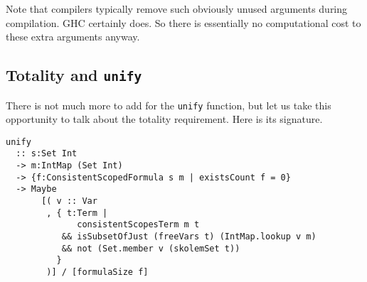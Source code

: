 \documentclass[sigconf, review]{acmart}
\newcommand{\tc}[1]{{\small\texttt{#1}}}
\newtheorem{principle}{Principle}
\begin{document}
Note that compilers typically remove such obviously unused arguments during
compilation. GHC certainly does. So there is essentially no computational cost to
these extra arguments anyway.

%
%
%

\subsection{Totality and \tc{unify}}
\label{checking-unify}

There is not much more to add for the \tc{unify} function, but let us take this
opportunity to talk about the totality requirement. Here is its signature.

\begin{verbatim}
unify
  :: s:Set Int
  -> m:IntMap (Set Int)
  -> {f:ConsistentScopedFormula s m | existsCount f = 0}
  -> Maybe
       [( v :: Var
        , { t:Term |
              consistentScopesTerm m t
           && isSubsetOfJust (freeVars t) (IntMap.lookup v m)
           && not (Set.member v (skolemSet t))
          }
        )] / [formulaSize f]
\end{verbatim}
\end{document}
